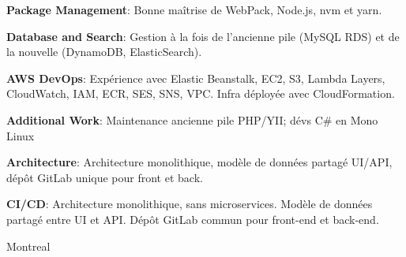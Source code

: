 \documentclass[
  a4paper,
   maincolor=cvblue,
   sectioncolor=cvblue,
   sidebarwidth=0.323\paperwidth,
]{fortysecondscv}
\begin{document}
\begin{cvtableNew}
{        \textbf{Package Management}: Bonne maîtrise de WebPack, Node.js, nvm et yarn.\vspace{5pt}

        \textbf{Database and Search}: Gestion à la fois de l’ancienne pile (MySQL RDS) et de la nouvelle (DynamoDB, ElasticSearch).\vspace{5pt}

        \textbf{AWS DevOps}: Expérience avec Elastic Beanstalk, EC2, S3, Lambda Layers, CloudWatch, IAM, ECR, SES, SNS, VPC. Infra déployée avec CloudFormation.\vspace{5pt}

        \textbf{Additional Work}: Maintenance ancienne pile PHP/YII; dévs C\# en Mono Linux\vspace{5pt}

        \textbf{Architecture}: Architecture monolithique, modèle de données partagé UI/API, dépôt GitLab unique pour front et back.\vspace{5pt}

        \textbf{CI/CD}: Architecture monolithique, sans microservices. Modèle de données partagé entre UI et API. Dépôt GitLab commun pour front-end et back-end.
      }
    {Montreal} %
\end{cvtableNew}








\newpage
\makebacksidebar
\end{document}
